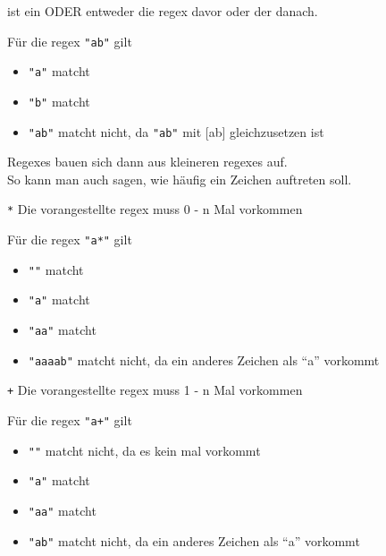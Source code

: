 \documentclass[ignorenonframetext,]{beamer}
\providecommand{\tightlist}{%
  \setlength{\itemsep}{0pt}\setlength{\parskip}{0pt}}
\begin{document}
\begin{frame}

\texttt{\textbar{}} ist ein ODER entweder die regex davor oder der
danach.

Für die regex \texttt{"a\textbar{}b"} gilt

\begin{itemize}
\tightlist
\item
  \texttt{"a"} matcht
\item
  \texttt{"b"} matcht
\item
  \texttt{"ab"} matcht nicht, da \texttt{"a\textbar{}b"} mit {[}ab{]}
  gleichzusetzen ist
\end{itemize}

\end{frame}

\begin{frame}

Regexes bauen sich dann aus kleineren regexes auf.\\
So kann man auch sagen, wie häufig ein Zeichen auftreten soll.

\end{frame}

\begin{frame}

\texttt{*} Die vorangestellte regex muss 0 - n Mal vorkommen

Für die regex \texttt{"a*"} gilt

\begin{itemize}
\tightlist
\item
  \texttt{""} matcht
\item
  \texttt{"a"} matcht
\item
  \texttt{"aa"} matcht
\item
  \texttt{"aaaab"} matcht nicht, da ein anderes Zeichen als ``a''
  vorkommt
\end{itemize}

\end{frame}

\begin{frame}

\texttt{+} Die vorangestellte regex muss 1 - n Mal vorkommen

Für die regex \texttt{"a+"} gilt

\begin{itemize}
\tightlist
\item
  \texttt{""} matcht nicht, da es kein mal vorkommt
\item
  \texttt{"a"} matcht
\item
  \texttt{"aa"} matcht
\item
  \texttt{"ab"} matcht nicht, da ein anderes Zeichen als ``a'' vorkommt
\end{itemize}

\end{frame}
\end{document}
